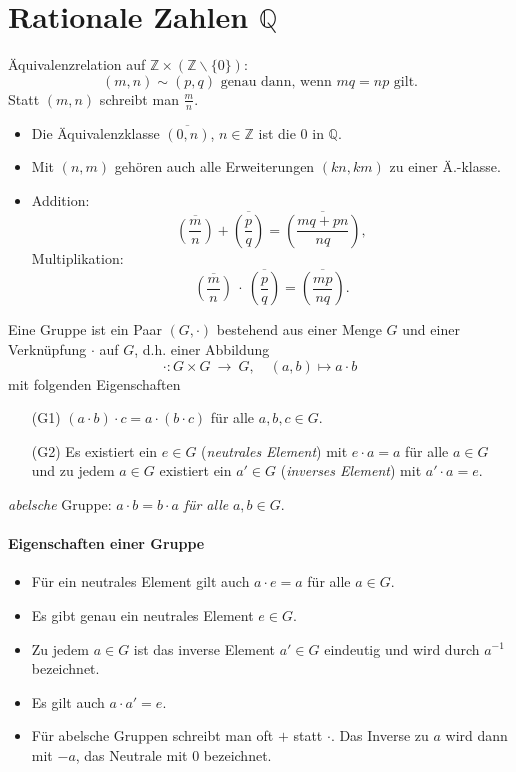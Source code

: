 \documentclass[a4paper,12pt,DIV15]{scrartcl}
\begin{document}
\section{Rationale Zahlen $\mathbb{Q}$}
Äquivalenzrelation auf $\mathbb{Z}\times(\mathbb{Z}\smallsetminus \{ 0\})$:
\[ (m,n) \sim (p,q) \mbox{ genau dann, wenn } mq=np \mbox{ gilt.} \]
Statt $(m,n)$ schreibt man $\frac{m}{n}$.
\begin{itemize}
\item Die Äquivalenzklasse $\overline{(0,n)}$, $n \in \mathbb{Z}$ ist
die $0$ in $\mathbb{Q}$.
\item Mit $(n,m)$ gehören auch alle Erweiterungen $(kn,km)$ zu einer
Ä.-klasse.  
\item Addition:  
\[ 
\overline{\genfrac(){}{}{m}{n}}+\overline{\genfrac(){}{}{p}{q}}=\overline{\genfrac(){}{}{mq+pn}{nq}},
\]
Multiplikation:
\[
\overline{\genfrac(){}{}{m}{n}} \ \cdot \ \overline{\genfrac(){}{}{p}{q}}=\overline{\genfrac(){}{}{mp}{nq}}.
\]
\end{itemize} 


\begin{defn}[Gruppe]
Eine {\color{red} Gruppe} ist ein Paar $(G,\cdot)$ bestehend aus einer Menge
$G$ und einer Verknüpfung $\cdot$ auf $G$, d.h. einer Abbildung
\[
 \cdot: G \times G \ \rightarrow \ G, \quad (a,b) \mapsto a \cdot b
\]
mit folgenden Eigenschaften
\begin{itemize}
\item [(G1)] $(a \cdot b) \cdot c =a \cdot (b \cdot c)$ für alle
$a,b,c \in G$.
\item [(G2)] Es existiert ein $e \in G$ ({\it neutrales Element}) mit $e \cdot a =a$ für alle $a
\in G$ und zu jedem $a \in G$ existiert ein $a' \in G$ ({\it inverses
Element}) mit $a' \cdot
a=e$. 
\end{itemize}  
{\it abelsche} Gruppe: $a \cdot b = b \cdot a$ \textsl{für alle} $a,b \in G$.
\end{defn}

\paragraph{Eigenschaften einer Gruppe}
\begin{itemize}
\item Für ein neutrales Element gilt auch $a \cdot e= a$ für alle
$a\in G$.
\item Es gibt genau ein neutrales Element $e \in G$.
\item Zu jedem $a \in G$ ist das inverse Element $a' \in G$ eindeutig
und wird durch $a^{-1}$ bezeichnet. 
\item Es gilt auch $a \cdot a'=e$. 
\item Für abelsche Gruppen schreibt man oft $+$ statt $\cdot$. Das Inverse zu $a$ wird dann mit $-a$, das Neutrale mit $0$ bezeichnet.
\end{itemize}
\end{document}
